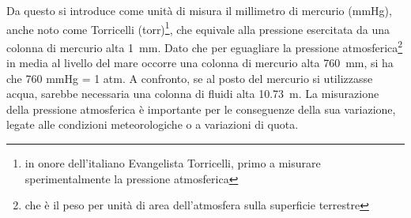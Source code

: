 Da questo si introduce come unità di misura il millimetro di mercurio (mmHg), anche noto come Torricelli (torr)\footnote{in onore dell'italiano Evangelista Torricelli, primo a misurare sperimentalmente la pressione atmosferica}, che equivale alla pressione esercitata da una colonna di mercurio alta \SI{1}{\milli \meter}.
Dato che per eguagliare la pressione atmosferica\footnote{che è il peso per unità di area dell'atmosfera sulla superficie terrestre} in media al livello del mare occorre una colonna di mercurio alta \SI{760}{\milli \meter}, si ha che 760 mmHg = 1 atm.
A confronto, se al posto del mercurio si utilizzasse acqua, sarebbe necessaria una colonna di fluidi alta \SI{10.73}{\meter}.
La misurazione della pressione atmosferica è importante per le conseguenze della sua variazione, legate alle condizioni meteorologiche o a variazioni di quota.
